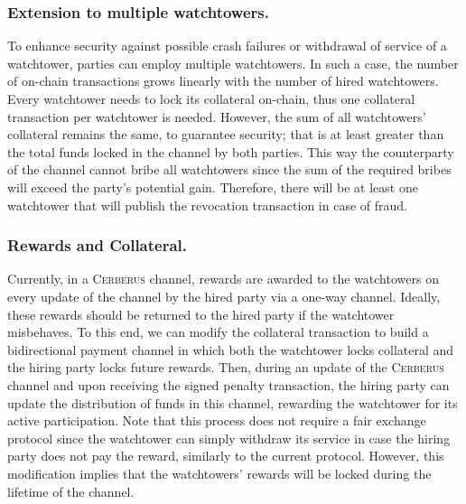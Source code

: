 \documentclass[runningheads]{llncs}
\newcommand{\sys}{\textsc{Cerberus}\xspace}
\begin{document}
\subsubsection*{Extension to multiple watchtowers.}
To enhance security against possible crash failures or withdrawal of service of a watchtower, parties can employ multiple watchtowers. In such a case, the number of on-chain transactions grows linearly with the number of hired watchtowers. Every watchtower needs to lock its collateral on-chain, thus one collateral transaction per watchtower is needed. However, the sum of all watchtowers' collateral remains the same, to guarantee security; that is at least greater than the total funds locked in the channel by both parties. This way the counterparty of the channel cannot bribe all watchtowers since the sum of the required bribes will exceed the party's potential gain. Therefore, there will be at least one watchtower that will publish the revocation transaction in case of fraud. 

\vspace{-3pt}
\subsubsection*{Rewards and Collateral.}
Currently, in a \sys channel, rewards are awarded to the watchtowers on every update of the channel by the hired party via a one-way channel. Ideally, these rewards should be returned to the hired party if the watchtower misbehaves. To this end, we can modify the collateral transaction to build a bidirectional payment channel in which both the watchtower locks collateral and the hiring party locks future rewards. Then, during an update of the \sys channel and upon receiving the signed penalty transaction, the hiring party can update the distribution of funds in this channel, rewarding the watchtower for its active participation. Note that this process does not require a fair exchange protocol since the watchtower can simply withdraw its service in case the hiring party does not pay the reward, similarly to the current protocol. However, this modification implies that the watchtowers' rewards will be locked during the lifetime of the channel.

\vspace{-3pt}
\end{document}
